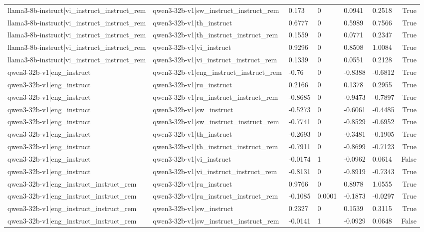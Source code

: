 \begin{table}
\begin{tabular}{llllllr}
llama3-8b-instruct|vi_instruct_instruct_rem & qwen3-32b-v1|sw_instruct_instruct_rem & 0.173 & 0 & 0.0941 & 0.2518 & True \\
llama3-8b-instruct|vi_instruct_instruct_rem & qwen3-32b-v1|th_instruct & 0.6777 & 0 & 0.5989 & 0.7566 & True \\
llama3-8b-instruct|vi_instruct_instruct_rem & qwen3-32b-v1|th_instruct_instruct_rem & 0.1559 & 0 & 0.0771 & 0.2347 & True \\
llama3-8b-instruct|vi_instruct_instruct_rem & qwen3-32b-v1|vi_instruct & 0.9296 & 0 & 0.8508 & 1.0084 & True \\
llama3-8b-instruct|vi_instruct_instruct_rem & qwen3-32b-v1|vi_instruct_instruct_rem & 0.1339 & 0 & 0.0551 & 0.2128 & True \\
qwen3-32b-v1|eng_instruct & qwen3-32b-v1|eng_instruct_instruct_rem & -0.76 & 0 & -0.8388 & -0.6812 & True \\
qwen3-32b-v1|eng_instruct & qwen3-32b-v1|ru_instruct & 0.2166 & 0 & 0.1378 & 0.2955 & True \\
qwen3-32b-v1|eng_instruct & qwen3-32b-v1|ru_instruct_instruct_rem & -0.8685 & 0 & -0.9473 & -0.7897 & True \\
qwen3-32b-v1|eng_instruct & qwen3-32b-v1|sw_instruct & -0.5273 & 0 & -0.6061 & -0.4485 & True \\
qwen3-32b-v1|eng_instruct & qwen3-32b-v1|sw_instruct_instruct_rem & -0.7741 & 0 & -0.8529 & -0.6952 & True \\
qwen3-32b-v1|eng_instruct & qwen3-32b-v1|th_instruct & -0.2693 & 0 & -0.3481 & -0.1905 & True \\
qwen3-32b-v1|eng_instruct & qwen3-32b-v1|th_instruct_instruct_rem & -0.7911 & 0 & -0.8699 & -0.7123 & True \\
qwen3-32b-v1|eng_instruct & qwen3-32b-v1|vi_instruct & -0.0174 & 1 & -0.0962 & 0.0614 & False \\
qwen3-32b-v1|eng_instruct & qwen3-32b-v1|vi_instruct_instruct_rem & -0.8131 & 0 & -0.8919 & -0.7343 & True \\
qwen3-32b-v1|eng_instruct_instruct_rem & qwen3-32b-v1|ru_instruct & 0.9766 & 0 & 0.8978 & 1.0555 & True \\
qwen3-32b-v1|eng_instruct_instruct_rem & qwen3-32b-v1|ru_instruct_instruct_rem & -0.1085 & 0.0001 & -0.1873 & -0.0297 & True \\
qwen3-32b-v1|eng_instruct_instruct_rem & qwen3-32b-v1|sw_instruct & 0.2327 & 0 & 0.1539 & 0.3115 & True \\
qwen3-32b-v1|eng_instruct_instruct_rem & qwen3-32b-v1|sw_instruct_instruct_rem & -0.0141 & 1 & -0.0929 & 0.0648 & False \\

\end{tabular}
\end{table}
